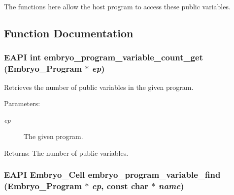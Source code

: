 The functions here allow the host program to access these public variables. 

\subsection{Function Documentation}
\hypertarget{group__Embryo__Public__Variable__Group_g3515ce41a3a62d86b866f4cadd0c74cd}{
\subsubsection{\setlength{\rightskip}{0pt plus 5cm}EAPI int embryo\_\-program\_\-variable\_\-count\_\-get (Embryo\_\-Program $\ast$ {\em ep})}}
\label{group__Embryo__Public__Variable__Group_g3515ce41a3a62d86b866f4cadd0c74cd}


Retrieves the number of public variables in the given program. 

\begin{Desc}
\item[Parameters:]
\begin{description}
\item[{\em ep}]The given program. \end{description}
\end{Desc}
\begin{Desc}
\item[Returns:]The number of public variables. \end{Desc}
\hypertarget{group__Embryo__Public__Variable__Group_g9714d1cbd46b3b0315a71c23413ad921}{
\subsubsection{\setlength{\rightskip}{0pt plus 5cm}EAPI Embryo\_\-Cell embryo\_\-program\_\-variable\_\-find (Embryo\_\-Program $\ast$ {\em ep}, \/  const char $\ast$ {\em name})}}
\label{group__Embryo__Public__Variable__Group_g9714d1cbd46b3b0315a71c23413ad921}


